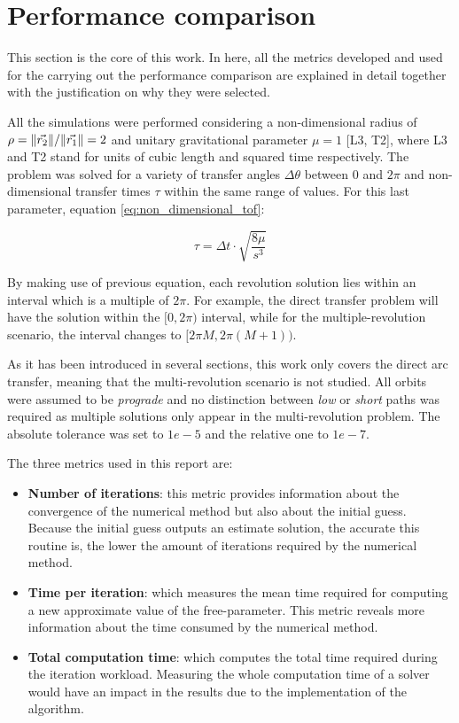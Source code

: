 \section{Performance comparison}

This section is the core of this work. In here, all the metrics developed and
used for the carrying out the performance comparison are explained in detail
together with the justification on why they were selected.

All the simulations were performed considering a non-dimensional radius of
$\rho=\lVert\vec{r_2}\rVert/\lVert\vec{r_1}\rVert=2$ and unitary gravitational parameter
$\mu=1$ [L3, T2], where L3 and T2 stand for units of cubic length and squared
time respectively. The problem was solved for a variety of transfer angles
$\Delta \theta$ between $0$ and $2\pi$ and non-dimensional transfer times $\tau$
within the same range of values. For this last parameter, equation
\ref{eq:non_dimensional_tof}:

\begin{equation}
  \tau =  \Delta t \cdot \sqrt{\frac{8\mu}{s^3}}
  \label{eq:non_dimensional_tof}
\end{equation}

By making use of previous equation, each revolution solution lies within an
interval which is a multiple of $2\pi$. For example, the direct transfer problem
will have the solution within the $[0, 2\pi)$ interval, while for the
multiple-revolution scenario, the interval changes to $[2\pi M, 2\pi(M+1))$.

As it has been introduced in several sections, this work only covers the direct
arc transfer, meaning that the multi-revolution scenario is not studied. All
orbits were assumed to be \textit{prograde} and no distinction between
\textit{low} or \textit{short} paths was required as multiple solutions only
appear in the multi-revolution problem. The absolute tolerance was set to $1e-5$
and the relative one to $1e-7$.

The three metrics used in this report are:

\begin{itemize}
  \item \textbf{Number of iterations}: this metric provides information about
        the convergence of the numerical method but also about the initial
        guess. Because the initial guess outputs an estimate solution, the
        accurate this routine is, the lower the amount of iterations required
        by the numerical method.
  \item \textbf{Time per iteration}: which measures the mean time required for
        computing a new approximate value of the free-parameter. This metric
        reveals more information about the time consumed by the numerical
        method.
  \item \textbf{Total computation time}: which computes the total time required
        during the iteration workload. Measuring the whole computation time of
        a solver would have an impact in the results due to the implementation
        of the algorithm.
\end{itemize}

